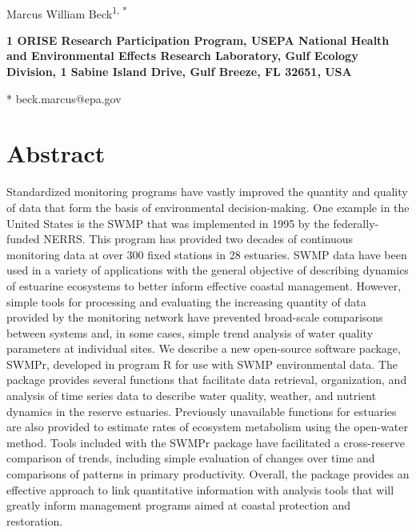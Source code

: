 \documentclass[10pt,letterpaper]{article}\usepackage[]{graphicx}\usepackage[]{color}
\date{}
\begin{document}
\vspace*{0.35in}

\begin{flushleft}
{\Large
\textbf{}
}
\newline
\\
Marcus William Beck\textsuperscript{1, *}

\bigskip
\bf{1} ORISE Research Participation Program, USEPA National Health and Environmental Effects Research Laboratory, Gulf Ecology Division, 1 Sabine Island Drive, Gulf Breeze, FL 32651, USA
\\
\bigskip

* beck.marcus@epa.gov

\end{flushleft}

\section*{Abstract}
Standardized monitoring programs have vastly improved the quantity and quality of data that form the basis of environmental decision-making.  One example in the United States is the \ac{SWMP} that was implemented in 1995 by the federally-funded \ac{NERRS}.  This program has provided two decades of continuous monitoring data at over 300 fixed stations in 28 estuaries.  \ac{SWMP} data have been used in a variety of applications with the general objective of describing dynamics of estuarine ecosystems to better inform effective coastal management.  However, simple tools for processing and evaluating the increasing quantity of data provided by the monitoring network have prevented broad-scale comparisons between systems and, in some cases, simple trend analysis of water quality parameters at individual sites.  We describe a new open-source software package, SWMPr, developed in program R for use with \ac{SWMP} environmental data.  The package provides several functions that facilitate data retrieval, organization, and analysis of time series data to describe water quality, weather, and nutrient dynamics in the reserve estuaries.  Previously unavailable functions for estuaries are also provided to estimate rates of ecosystem metabolism using the open-water method.  Tools included with the SWMPr package have facilitated a cross-reserve comparison of trends, including simple evaluation of changes over time and comparisons of patterns in primary productivity.  Overall, the package provides an effective approach to link quantitative information with analysis tools that will greatly inform management programs aimed at coastal protection and restoration.
\end{document}
